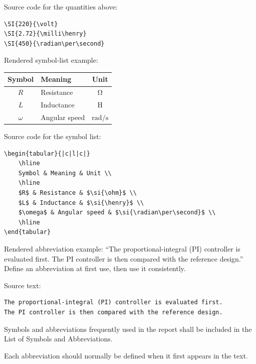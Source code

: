 {Source code for the quantities above:

\begin{verbatim}
\SI{220}{\volt}
\SI{2.72}{\milli\henry}
\SI{450}{\radian\per\second}
\end{verbatim}

Rendered symbol-list example:

\begin{center}
\begin{tabular}{|c|l|c|}
    \hline
    Symbol & Meaning & Unit \\
    \hline
    $R$ & Resistance & $\si{\ohm}$ \\
    $L$ & Inductance & $\si{\henry}$ \\
    $\omega$ & Angular speed & $\si{\radian\per\second}$ \\
    \hline
\end{tabular}
\end{center}

Source code for the symbol list:

\begin{verbatim}
\begin{tabular}{|c|l|c|}
    \hline
    Symbol & Meaning & Unit \\
    \hline
    $R$ & Resistance & $\si{\ohm}$ \\
    $L$ & Inductance & $\si{\henry}$ \\
    $\omega$ & Angular speed & $\si{\radian\per\second}$ \\
    \hline
\end{tabular}
\end{verbatim}

Rendered abbreviation example: ``The proportional-integral (PI)
controller is evaluated first. The PI controller is then compared
with the reference design.'' Define an abbreviation at first use,
then use it consistently.

Source text:

\begin{verbatim}
The proportional-integral (PI) controller is evaluated first.
The PI controller is then compared with the reference design.
\end{verbatim}

Symbols and abbreviations frequently used in the report shall be
included in the List of Symbols and Abbreviations.

Each abbreviation should normally be defined when it first appears
in the text.


}

